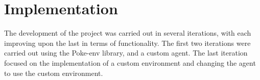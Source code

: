 \chapter{Implementation}
\label{chap:implementation}

The development of the project was carried out in several iterations, with each 
improving upon the last in terms of functionality.
The first two iterations were carried out using the Poke-env library, and a 
custom agent. The last iteration focused on the implementation of a custom 
environment and changing the agent to use the custom environment.





